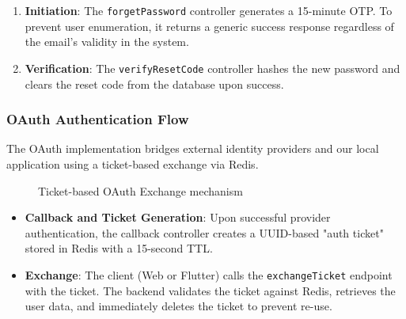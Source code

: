 \begin{enumerate}
    \item \textbf{Initiation}: The \texttt{forgetPassword} controller generates a 15-minute OTP. To prevent user enumeration, it returns a generic success response regardless of the email's validity in the system.
    \item \textbf{Verification}: The \texttt{verifyResetCode} controller hashes the new password and clears the reset code from the database upon success.
\end{enumerate}

\subsubsection{OAuth Authentication Flow}
The OAuth implementation bridges external identity providers and our local application using a ticket-based exchange via Redis.

\begin{figure}[H]
\centering
{}
\caption{Ticket-based OAuth Exchange mechanism}
\label{fig:oauth-flow}
\end{figure}

\begin{itemize}
    \item \textbf{Callback and Ticket Generation}: Upon successful provider authentication, the callback controller creates a UUID-based "auth ticket" stored in Redis with a 15-second TTL.
    \item \textbf{Exchange}: The client (Web or Flutter) calls the \texttt{exchangeTicket} endpoint with the ticket. The backend validates the ticket against Redis, retrieves the user data, and immediately deletes the ticket to prevent re-use.
\end{itemize}
